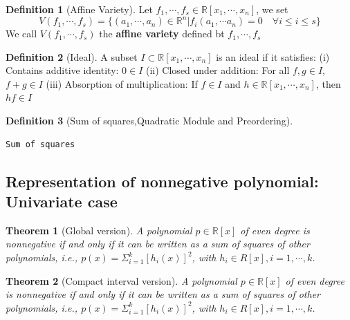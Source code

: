 \documentclass[
]{book}
\newtheorem{theorem}{Theorem}[chapter]
\theoremstyle{definition}
\newtheorem{definition}{Definition}[chapter]
\theoremstyle{definition}
\theoremstyle{definition}
\theoremstyle{definition}
\theoremstyle{remark}
\begin{document}
\begin{definition}[Affine Variety]
\protect\hypertarget{def:affinevariety}{}\label{def:affinevariety}Let \(f_1,\cdots,f_s\in\mathbb{R}[x_1,\cdots,x_n]\), we set \[V(f_1,\cdots,f_s) = \{(a_1,\cdots,a_n)\in\mathbb{R}^n|f_i(a_1,\cdots a_n)=0 \quad \forall i\leq i\leq s\}\] We call \(V(f_1,\cdots,f_s)\) the \textbf{affine variety} defined bt \(f_1,\cdots,f_s\)
\end{definition}

\begin{definition}[Ideal]
\protect\hypertarget{def:ideal}{}\label{def:ideal}A subset \(I\subset \mathbb{R}[x_1,\cdots,x_n]\) is an ideal if it satisfies:
(i) Contains additive identity: \(0\in I\)
(ii) Closed under addition: For all \(f,g\in I\), \(f+g\in I\)
(iii) Absorption of multiplication: If \(f\in I\) and \(h\in \mathbb{R}[x_1,\cdots,x_n]\), then \(hf\in I\)
\end{definition}

\begin{definition}[Sum of squares,Quadratic Module and Preordering]
\protect\hypertarget{def:sosquadpreorder}{}\label{def:sosquadpreorder}\leavevmode

\begin{verbatim}
Sum of squares
\end{verbatim}

\end{definition}

\hypertarget{representation-of-nonnegative-polynomial-univariate-case}{%
\subsection{Representation of nonnegative polynomial: Univariate case}\label{representation-of-nonnegative-polynomial-univariate-case}}

\begin{theorem}[Global version]
\protect\hypertarget{thm:uniglobal}{}\label{thm:uniglobal}A polynomial \(p\in\mathbb{R}[x]\) of even degree is nonnegative if and only if it can be written as a sum of squares of other polynomials, i.e., \(p(x) = \Sigma^k_{i=1}[h_i(x)]^2\), with \(h_i\in R[x], i = 1,\cdots, k\).
\end{theorem}

\begin{theorem}[Compact interval version]
\protect\hypertarget{thm:unifiniteinterval}{}\label{thm:unifiniteinterval}A polynomial \(p\in\mathbb{R}[x]\) of even degree is nonnegative if and only if it can be written as a sum of squares of other polynomials, i.e., \(p(x) = \Sigma^k_{i=1}[h_i(x)]^2\), with \(h_i\in R[x], i = 1,\cdots, k\).
\end{theorem}
\end{document}
